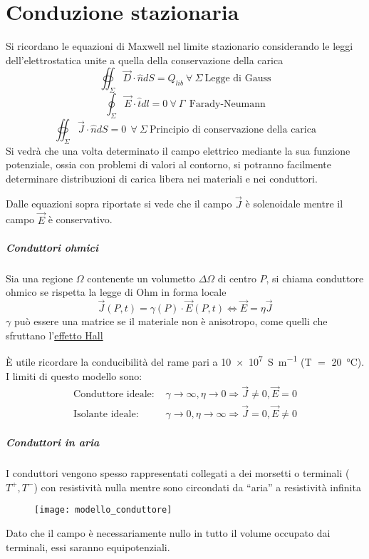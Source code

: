 \section{Conduzione stazionaria}
Si ricordano le equazioni di Maxwell nel limite stazionario
considerando le leggi dell'elettrostatica unite a quella della
conservazione della carica 
$$
\oiint_{\Sigma} \vec{D}\cdot \hat{n} dS = Q_{lib}\ 
\forall\ \Sigma \ \text{Legge di Gauss}
$$
$$
\oint_{\Sigma}\vec{E}\cdot\hat{t} dl = 0 \ \forall\ \Gamma\ \ 
\text{Farady-Neumann}
$$
$$
\oiint_{\Sigma} \vec{J}\cdot\hat{n}dS = 0\ \ \forall\ \Sigma\
 \text{Principio di conservazione della carica}
$$
Si vedrà che una volta determinato il campo elettrico mediante
la sua funzione potenziale, ossia con problemi di valori al
contorno, si potranno facilmente determinare distribuzioni
di carica libera nei materiali e nei conduttori.

Dalle equazioni sopra riportate si vede che il campo
$\vec{J}$ è solenoidale mentre il campo $\vec{E}$ è 
conservativo.

\subparagraph{Conduttori ohmici}
Sia una regione $\Omega$ contenente un volumetto $\Delta\Omega$
di centro $P$, si chiama conduttore ohmico se rispetta la legge
di Ohm in forma locale 
$$
\vec{J}(P,t) = \gamma(P)\cdot\vec{E}(P,t) \Leftrightarrow \vec{E} = \eta\vec{J}
$$
$\gamma$ può essere una matrice se il materiale non è anisotropo, 
come quelli che sfruttano l'\href{https://it.wikipedia.org/wiki/Effetto_Hall}{effetto Hall}
 
È utile ricordare la conducibilità del rame pari a \SI{10e7}{\siemens\per\meter} (T $=$ \SI{20}{\celsius}). I limiti di
questo modello sono:
\begin{align*}
\text{Conduttore ideale: }& \gamma\to\infty,\eta\to 0 \Rightarrow 
\vec{J}\neq 0, \vec{E} = 0 \\
\text{Isolante ideale: }& \gamma\to 0 ,\eta\to\infty \Rightarrow
\vec{J} =0, \vec{E}\neq 0
\end{align*}

\subparagraph{Conduttori in aria} I conduttori vengono spesso rappresentati
collegati a dei morsetti o terminali ($T^+,T^-$) con resistività nulla 
mentre sono circondati da ``aria'' a resistività infinita
\begin{figure}[H]
\centering
\texttt{[image: modello\_conduttore]}
\end{figure}
Dato che il campo è necessariamente nullo in tutto il volume occupato
dai terminali, essi saranno equipotenziali.

